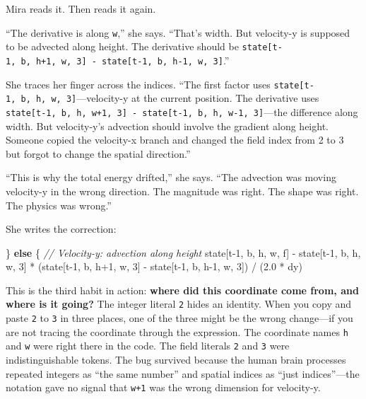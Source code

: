 \documentclass[11pt,]{article}
\newenvironment{Shaded}{}{}
\newcommand{\CommentTok}[1]{\textcolor[rgb]{0.38,0.63,0.69}{\textit{#1}}}
\newcommand{\DecValTok}[1]{\textcolor[rgb]{0.25,0.63,0.44}{#1}}
\newcommand{\KeywordTok}[1]{\textcolor[rgb]{0.00,0.44,0.13}{\textbf{#1}}}
\newcommand{\NormalTok}[1]{#1}
\newcommand{\OperatorTok}[1]{\textcolor[rgb]{0.40,0.40,0.40}{#1}}
\begin{document}
Mira reads it. Then reads it again.

``The derivative is along \texttt{w},'' she says. ``That's width. But
velocity-y is supposed to be advected along height. The derivative
should be
\texttt{state{[}t-1,\ b,\ h+1,\ w,\ 3{]}\ -\ state{[}t-1,\ b,\ h-1,\ w,\ 3{]}}.''

She traces her finger across the indices. ``The first factor uses
\texttt{state{[}t-1,\ b,\ h,\ w,\ 3{]}}---velocity-y at the current
position. The derivative uses
\texttt{state{[}t-1,\ b,\ h,\ w+1,\ 3{]}\ -\ state{[}t-1,\ b,\ h,\ w-1,\ 3{]}}---the
difference along width. But velocity-y's advection should involve the
gradient along height. Someone copied the velocity-x branch and changed
the field index from 2 to 3 but forgot to change the spatial
direction.''

``This is why the total energy drifted,'' she says. ``The advection was
moving velocity-y in the wrong direction. The magnitude was right. The
shape was right. The physics was wrong.''

She writes the correction:

\begin{Shaded}
\begin{Highlighting}[]
\OperatorTok{\}} \KeywordTok{else} \OperatorTok{\{}
    \CommentTok{// Velocity-y: advection along height}
\NormalTok{    state}\OperatorTok{[}\NormalTok{t-}\DecValTok{1}\NormalTok{, b, h, w, f}\OperatorTok{]}\NormalTok{ -}
\NormalTok{        state}\OperatorTok{[}\NormalTok{t-}\DecValTok{1}\NormalTok{, b, h, w, }\DecValTok{3}\OperatorTok{]}\NormalTok{ *}
\NormalTok{        (state}\OperatorTok{[}\NormalTok{t-}\DecValTok{1}\NormalTok{, b, h+}\DecValTok{1}\NormalTok{, w, }\DecValTok{3}\OperatorTok{]}\NormalTok{ - state}\OperatorTok{[}\NormalTok{t-}\DecValTok{1}\NormalTok{, b, h-}\DecValTok{1}\NormalTok{, w, }\DecValTok{3}\OperatorTok{]}\NormalTok{) / (}\DecValTok{2.0}\NormalTok{ * dy)}
\end{Highlighting}
\end{Shaded}

This is the third habit in action: \textbf{where did this coordinate
come from, and where is it going?} The integer literal \texttt{2} hides
an identity. When you copy and paste \texttt{2} to \texttt{3} in three
places, one of the three might be the wrong change---if you are not
tracing the coordinate through the expression. The coordinate names
\texttt{h} and \texttt{w} were right there in the code. The field
literals \texttt{2} and \texttt{3} were indistinguishable tokens. The
bug survived because the human brain processes repeated integers as
``the same number'' and spatial indices as ``just indices''---the
notation gave no signal that \texttt{w+1} was the wrong dimension for
velocity-y.
\end{document}
